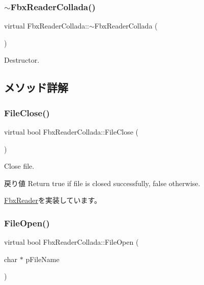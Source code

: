 \subsubsection{\texorpdfstring{$\sim$\+Fbx\+Reader\+Collada()}{~FbxReaderCollada()}}
{\footnotesize\ttfamily virtual Fbx\+Reader\+Collada\+::$\sim$\+Fbx\+Reader\+Collada (\begin{DoxyParamCaption}{ }\end{DoxyParamCaption})\hspace{0.3cm}{\ttfamily [virtual]}}



Destructor. 



\subsection{メソッド詳解}
\mbox{\label{class_fbx_reader_collada_a5668036ed12534fd339f3106c0d09864}} 
\subsubsection{\texorpdfstring{File\+Close()}{FileClose()}}
{\footnotesize\ttfamily virtual bool Fbx\+Reader\+Collada\+::\+File\+Close (\begin{DoxyParamCaption}{ }\end{DoxyParamCaption})\hspace{0.3cm}{\ttfamily [virtual]}}

Close file. \begin{DoxyReturn}{戻り値}
Return true if file is closed successfully, false otherwise. 
\end{DoxyReturn}


\hyperlink{class_fbx_reader_a327df94e5c24315fc5cbcedf0e7bb615}{Fbx\+Reader}を実装しています。

\mbox{\label{class_fbx_reader_collada_aec7a5267f85187eeb26dd55ec250119e}} 
\subsubsection{\texorpdfstring{File\+Open()}{FileOpen()}}
{\footnotesize\ttfamily virtual bool Fbx\+Reader\+Collada\+::\+File\+Open (\begin{DoxyParamCaption}\item[{char $\ast$}]{p\+File\+Name }\end{DoxyParamCaption})\hspace{0.3cm}{\ttfamily [virtual]}}

